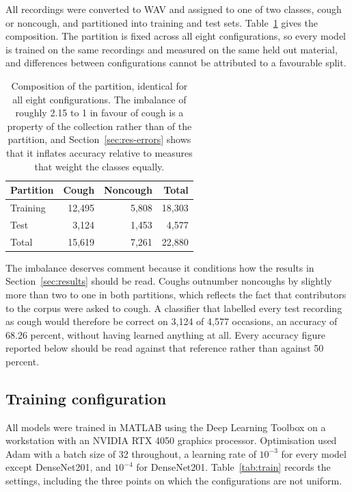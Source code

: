 \documentclass[pdflatex,sn-mathphys-num]{sn-jnl}
\begin{document}
All recordings were converted to WAV and assigned to one of two classes,
cough or noncough, and partitioned into training and test sets.
Table~\ref{tab:split} gives the composition. The partition is fixed across all
eight configurations, so every model is trained on the same recordings and
measured on the same held out material, and differences between configurations
cannot be attributed to a favourable split.

\begin{table}[t]
\centering
\footnotesize
\caption{Composition of the partition, identical for all eight
configurations. The imbalance of roughly 2.15 to 1 in favour of cough is a
property of the collection rather than of the partition, and
Section~\ref{sec:res-errors} shows that it inflates accuracy relative to
measures that weight the classes equally.}
\label{tab:split}
\begin{tabular}{@{}lrrr@{}}
\toprule
Partition & Cough & Noncough & Total \\
\midrule
Training & 12{,}495 & 5{,}808 & 18{,}303 \\
Test & 3{,}124 & 1{,}453 & 4{,}577 \\
\midrule
Total & 15{,}619 & 7{,}261 & 22{,}880 \\
\bottomrule
\end{tabular}
\end{table}

The imbalance deserves comment because it conditions how the results in
Section~\ref{sec:results} should be read. Coughs outnumber noncoughs by
slightly more than two to one in both partitions, which reflects the fact that
contributors to the corpus were asked to cough. A classifier that labelled
every test recording as cough would therefore be correct on 3,124 of 4,577
occasions, an accuracy of 68.26 percent, without having learned anything at
all. Every accuracy figure reported below should be read against that
reference rather than against 50 percent.

\subsection{Training configuration}\label{sec:s-train}

All models were trained in MATLAB using the Deep Learning Toolbox on a
workstation with an NVIDIA RTX 4050 graphics processor. Optimisation used
Adam with a batch size of 32 throughout, a learning rate of $10^{-3}$ for
every model except DenseNet201, and $10^{-4}$ for DenseNet201.
Table~\ref{tab:train} records the settings, including the three points on
which the configurations are not uniform.
\end{document}
